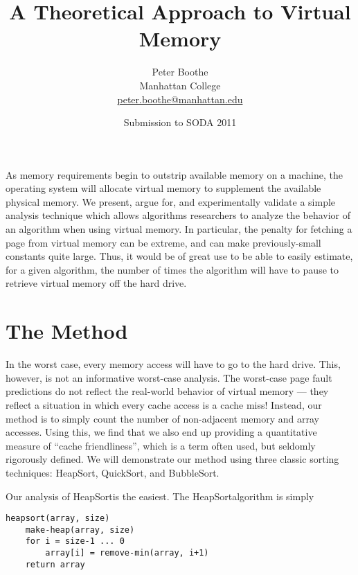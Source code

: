 \documentclass[11pt]{article}
\title{A Theoretical Approach to Virtual Memory}
\author{Peter Boothe\\
Manhattan College\\
\url{peter.boothe@manhattan.edu}}
\date{Submission to SODA 2011} %
\newcommand{\heapsort}{{\sc HeapSort}}
\newcommand{\quicksort}{{\sc QuickSort}}
\newcommand{\bubblesort}{{\sc BubbleSort}}
\begin{document}
\maketitle

As memory requirements begin to outstrip available memory on a machine, the
operating system will allocate virtual memory to supplement the available
physical memory.  We present, argue for, and experimentally validate a simple
analysis technique which allows algorithms researchers to analyze the behavior
of an algorithm when using virtual memory.  In particular, the penalty for
fetching a page from virtual memory can be extreme, and can make
previously-small constants quite large. Thus, it would be of great use to be
able to easily estimate, for a given algorithm, the number of times the
algorithm will have to pause to retrieve virtual memory off the hard drive.

\section{The Method}

In the worst case, every memory access will have to go to the hard drive.
This, however, is not an informative worst-case analysis.  The worst-case page
fault predictions do not reflect the real-world behavior of virtual memory ---
they reflect a situation in which every cache access is a cache miss!  Instead,
our method is to simply count the number of non-adjacent memory and array
accesses.  Using this, we find that we also end up providing a quantitative
measure of ``cache friendliness'', which is a term often used, but seldomly
rigorously defined.  We will demonstrate our method using three classic sorting
techniques: \heapsort, \quicksort, and \bubblesort.

Our analysis of \heapsort is the easiest.  The \heapsort algorithm is simply 
\begin{verbatim}
heapsort(array, size)
    make-heap(array, size)
    for i = size-1 ... 0
        array[i] = remove-min(array, i+1)
    return array
\end{verbatim}
\end{document}
